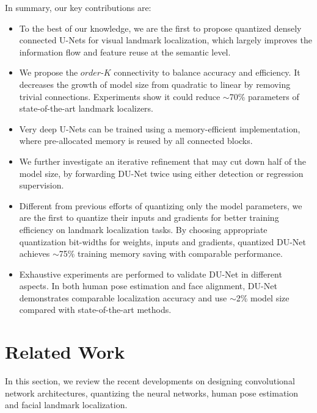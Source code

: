 \documentclass[runningheads]{llncs}
\begin{document}
In summary, our key contributions are:
\begin{itemize}
    \item To the best of our knowledge, we are the first to propose quantized densely connected U-Nets for visual landmark localization, which largely improves the information flow and feature reuse at the semantic level.
    \item We propose the $order$-$K$ connectivity to balance accuracy and efficiency. It decreases the growth of model size from quadratic to linear by removing trivial connections. Experiments show it could reduce $\sim$70\% parameters of state-of-the-art landmark localizers.
    \item Very deep U-Nets can be trained using a memory-efficient implementation, where pre-allocated memory is reused by all connected blocks.
    \item We further investigate an iterative refinement that may cut down half of the model size, by forwarding DU-Net twice using either detection or regression supervision.
\item Different from previous efforts of quantizing only the model parameters, we are the first to quantize their inputs and gradients for better training efficiency on landmark localization tasks. By choosing appropriate quantization bit-widths for weights, inputs and gradients, quantized DU-Net achieves $\sim$75\% training memory saving with comparable performance. 
\item Exhaustive experiments are performed to validate DU-Net in different aspects. In both human pose estimation and face alignment, DU-Net demonstrates comparable localization accuracy and use $\sim$2\% model size compared with state-of-the-art methods.
\end{itemize}


























%
 \section{Related Work}
In this section, we review the recent developments on designing convolutional network architectures, quantizing the neural networks, human pose estimation and facial landmark localization.
\end{document}
